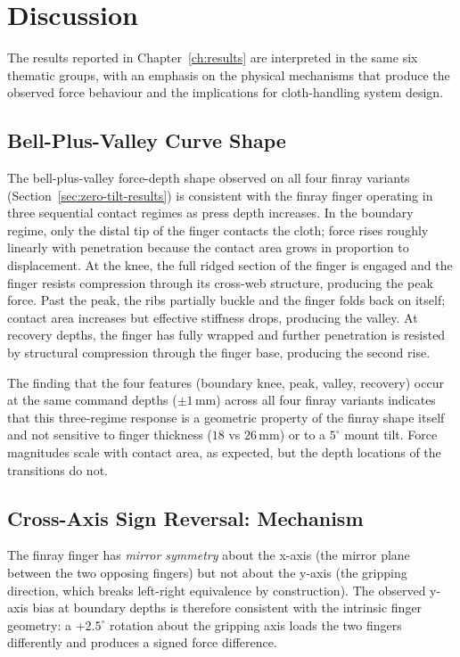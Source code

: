 \chapter{\rm\bfseries Discussion}
\label{ch:discussion}

The results reported in Chapter~\ref{ch:results} are interpreted in the
same six thematic groups, with an emphasis on the physical mechanisms
that produce the observed force behaviour and the implications for
cloth-handling system design.

\section{Bell-Plus-Valley Curve Shape}
\label{sec:bell-plus-valley}

The bell-plus-valley force-depth shape observed on all four finray
variants (Section~\ref{sec:zero-tilt-results}) is consistent with the
finray finger operating in three sequential contact regimes as press
depth increases. In the boundary regime, only the distal tip of the
finger contacts the cloth; force rises roughly linearly with penetration
because the contact area grows in proportion to displacement. At the
knee, the full ridged section of the finger is engaged and the finger
resists compression through its cross-web structure, producing the peak
force. Past the peak, the ribs partially buckle and the finger folds
back on itself; contact area increases but effective stiffness drops,
producing the valley. At recovery depths, the finger has fully wrapped
and further penetration is resisted by structural compression through
the finger base, producing the second rise.

The finding that the four features (boundary knee, peak, valley,
recovery) occur at the same command depths ($\pm 1$\,mm) across all
four finray variants indicates that this three-regime response is a
geometric property of the finray shape itself and not sensitive to
finger thickness ($18$ vs $26$\,mm) or to a $5^{\circ}$ mount tilt.
Force magnitudes scale with contact area, as expected, but the depth
locations of the transitions do not.

\section{Cross-Axis Sign Reversal: Mechanism}
\label{sec:cross-axis-mechanism}

The finray finger has \emph{mirror symmetry} about the x-axis (the
mirror plane between the two opposing fingers) but not about the y-axis
(the gripping direction, which breaks left-right equivalence by
construction). The observed y-axis bias at boundary depths is therefore
consistent with the intrinsic finger geometry: a $+2.5^{\circ}$ rotation
about the gripping axis loads the two fingers differently and produces
a signed force difference.

